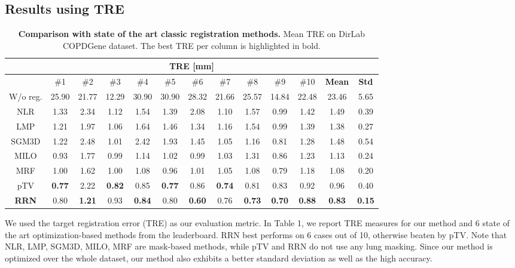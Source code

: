 \documentclass[runningheads]{llncs}
\begin{document}
\subsection{Results using TRE}
\begin{table}\centering
\caption{\textbf{Comparison with state of the art classic registration methods.} Mean TRE on DirLab COPDGene dataset. The best TRE per column is highlighted in bold.}\label{tab1}
\begin{tabular}{|c|c| c| c| c| c| c| c| c| c| c |c|c|}
\hline
\multicolumn{13}{|c|}{TRE [mm]} \\
\hline
 & \#1 & \#2 & \#3 & \#4 & \#5 & \#6 & \#7 & \#8 & \#9 & \#10 & \textbf{Mean} & \textbf{Std}\\
\hline
W/o reg. &  25.90 &21.77&12.29&30.90&30.90&28.32&21.66&25.57&14.84&22.48 & 23.46 & 5.65\\
\hline
NLR \cite{ruhaakEstimationLargeMotion2017}&  1.33 & 2.34 & 1.12 & 1.54 & 1.39 & 2.08 & 1.10 & 1.57 & 0.99 & 1.42 & 1.49 & 0.39\\\hline
LMP \cite{polzinCombiningAutomaticLandmark}&  1.21 & 1.97 & 1.06 & 1.64 & 1.46 & 1.34 & 1.16 & 1.54 & 0.99 & 1.39 & 1.38 & 0.27 \\\hline
SGM3D \cite{hermannEvaluationScanLineOptimization2014}&  1.22 & 2.48 & 1.01 & 2.42 & 1.93 & 1.45 & 1.05 & 1.16 & 0.81 & 1.28 & 1.48 & 0.54\\\hline
MILO \cite{castilloComputingGlobalMinimizers2014}&  0.93 & 1.77 & 0.99 & 1.14 & 1.02 & 0.99 & 1.03 & 1.31 & 0.86 & 1.23 & 1.13 & 0.24\\\hline
MRF \cite{heinrichEstimatingLargeLung2015b}&  1.00 & 1.62 & 1.00 & 1.08 & 0.96 & 1.01 & 1.05 & 1.08 & 0.79 & 1.18 & 1.08 & 0.20\\\hline
pTV \cite{vishnevskiyIsotropicTotalVariation2017}&  \textbf{0.77} & 2.22 & \textbf{0.82} & 0.85 &\textbf{0.77} & 0.86 & \textbf{0.74} & 0.81 & 0.83 & 0.92 & 0.96 & 0.40\\\hline
\textbf{RRN} &  0.80 & \textbf{1.21} & 0.93 & \textbf{0.84} & 0.80 & \textbf{0.60} & 0.76 & \textbf{0.73} & \textbf{0.70} & \textbf{0.88} & \textbf{0.83} & \textbf{0.15}\\\hline
\end{tabular}
\end{table}
We used the target registration error (TRE) as our evaluation metric. In Table 1, we report TRE measures for our method and 6 state of the art optimization-based methods from the leaderboard. RRN best performs on 6 cases out of 10, otherwise beaten by pTV. Note that NLR, LMP, SGM3D, MILO, MRF are mask-based methods, while pTV and RRN do not use any lung masking. Since our method is optimized over the whole dataset, our method also exhibits a better standard deviation as well as the high accuracy. 
\end{document}
